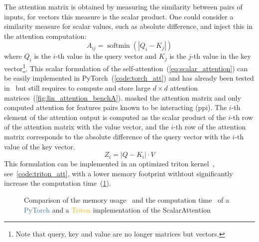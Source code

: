\documentclass[../main.tex]{subfiles}
\begin{document}
		The attention matrix is obtained by measuring the similarity between pairs of inputs, for vectors this measure is the scalar product.
		One could consider a similarity measure for scalar values, such as absolute difference, and inject this in the attention computation:
		\begin{equation}
			A_{ij} = \operatorname{softmin}\left(\left|Q_{i} - K_{j} \right| \right) \label{eq:scalar_attention}
		\end{equation}
		where \(Q_{i}\) is the \(i\)-th value in the query vector and \(K_{j}\) is the \(j\)-th value in the key vector\footnote{Note that query, key and value are no longer matrices but vectors.}.
		This scalar formulation of the self-attention~(\cref{eq:scalar_attention}) can be easily implemented in PyTorch~(\cref{code:torch_att}) and has already been tested in~\cite{Lacan2023} but still requires to compute and store large \(d\times d\) attention matrices~(\cref{fig:lin_attention_benchA}).
		\citeauthor{Lacan2023} masked the attention matrix and only computed attention for features pairs known to be interacting (\gls{ppi})\cite{Lacan2023}.
		The \(i\)-th element of the attention output is computed as the scalar product of the \(i\)-th row of the attention matrix with the value vector, and the \(i\)-th row of the attention matrix corresponds to the absolute difference of the query vector with the \(i\)-th value of the key vector.
		\begin{equation}
			Z_{i} = \left| Q - K_{i} \right| \cdot V
		\end{equation}
		This formulation can be implemented in an optimized triton kernel~\cite{TritonLang}, see~\cref{code:triton_att}, with a lower memory footprint withtout significantly increase the computation time~(\cref{fig:lin_attention_bench}).

		\begin{figure}[htbp]
			\centering
			\begin{subcaptiongroup}
				\label{fig:lin_attention_benchA}
				\label{fig:lin_attention_benchB}
			\end{subcaptiongroup}
			\caption{Comparison of the memory usage~ and the computation time~ of a \textcolor[HTML]{3969AC}{PyTorch} and a \textcolor[HTML]{F2B701}{Triton} implementation of the ScalarAttention}
			\label{fig:lin_attention_bench}
		\end{figure}
\end{document}
